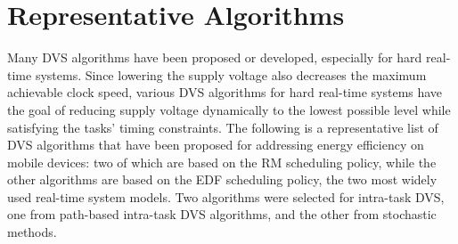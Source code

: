 \documentclass[10pt,article]{IEEEtran}
\begin{document}
\section{Representative Algorithms} \label{hard-rt-algs}
Many DVS algorithms have been proposed or developed, especially for hard real-time systems. Since lowering the supply voltage also decreases the maximum achievable clock speed, various DVS algorithms for hard real-time systems have the goal of reducing supply voltage dynamically to the lowest possible level while satisfying the tasks' timing constraints\cite{kim-2}. The following is a representative list of DVS algorithms that have been proposed for addressing energy efficiency on mobile devices: two of which are based on the RM scheduling policy, while the other algorithms are based on the EDF scheduling policy, the two most widely used real-time system models\cite{w-s-liu}. Two algorithms were selected for intra-task DVS, one from path-based intra-task DVS algorithms, and the other from stochastic methods.
\end{document}
